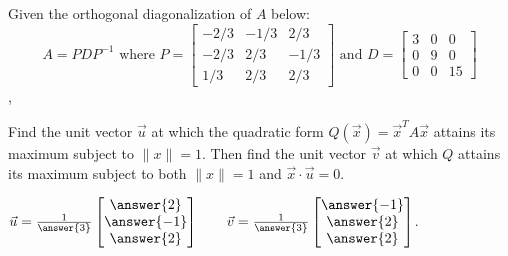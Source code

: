 \documentclass{ximera}
\begin{document}
 \begin{question}  
 Given the orthogonal diagonalization of $A$ below: 
$$A = PDP^{-1} \text{  where  } P = \begin{bmatrix}  -2/3
		&-1/3&2/3\\ -2/3&2/3&-1/3\\ 1/3& 2/3& 2/3\end{bmatrix} \text{  and
		} D= \begin{bmatrix} 3&0&0\\0&9&0\\0&0&15\end{bmatrix}$$, 

Find the unit vector $\vec{u}$ at which the quadratic form $Q(\vec{x}) =
\vec{x}^{T}A\vec{x}$ attains its maximum subject to $\| x\| = 1$.  Then find the unit vector
$\vec{v}$ at which $Q$ attains its maximum subject to both $\| x\| =1$ and $\vec{x}\cdot
\vec{u}=0$. 

$\vec{u} = \frac{1}{\answer{3}} \begin{bmatrix} \answer{2}\\ \answer{-1}\\ \answer{2} \end{bmatrix} 
\qquad 
\vec{v} = \frac{1}{\answer{3}} \begin{bmatrix} \answer{-1}\\ \answer{2}\\ \answer{2} \end{bmatrix}$. 
  	  		 		
 \end{question} 		                       
  		                       
  	  		                       
  	  		                       
  	  		                       
  	  		                       
  	  		                       

  
\end{document}
